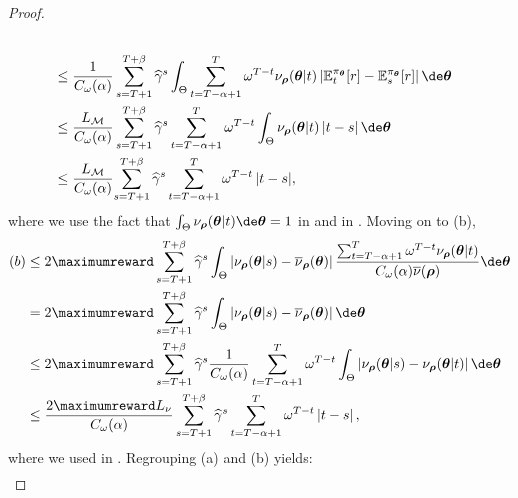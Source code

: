 \begin{proof}
\begin{align}
    \nonumber\\
    & \le \frac{1}{C_\omega(\alpha)}  \sum_{s=T+1}^{T+\beta} \widehat{\gamma}^s \int_{\Theta}  \sum_{t=T-\alpha+1}^T \omega^{T-t} {\nu}_{\boldsymbol\rho}(\boldsymbol\theta|t) \left|\mathbb{E}_t^{\pi_{\boldsymbol\theta}}[r] - \mathbb{E}_s^{\pi_{\boldsymbol\theta}}[r] \right| \de \boldsymbol\theta  
    \nonumber\\
    &  \le \frac{L_{\mathcal{M}}}{C_\omega(\alpha)}  \sum_{s=T+1}^{T+\beta} \widehat{\gamma}^s  \sum_{t=T-\alpha+1}^T \omega^{T-t} \int_{\Theta} \nu_{\boldsymbol\rho}(\boldsymbol\theta|t) \left|t-s \right|  \de \boldsymbol\theta 
    \label{eq:last_tkt1}\\
    & \le \frac{L_{\mathcal{M}}}{C_\omega(\alpha)}  {\sum_{s=T+1}^{T+\beta} \widehat{\gamma}^s   \sum_{t=T-\alpha+1}^T \omega^{T-t} \left|t-s \right|}, 
    \label{eq:last_tkt2}
\end{align}
where we use the fact that $\textstyle\int_{\Theta} {\nu}_{\boldsymbol\rho}(\boldsymbol\theta|t) \de \boldsymbol\theta = 1$ in  and  in . 
Moving on to (b),
\begin{align}
    (b) & \le 2\maximumreward  \sum_{s=T+1}^{T+\beta} \widehat{\gamma}^s \int_{\Theta}  \left|\nu_{\boldsymbol\rho}(\boldsymbol\theta|s) - \overline{\nu}_{\boldsymbol\rho}(\boldsymbol\theta)\right| \frac{\sum_{t=T-\alpha+1}^T \omega^{T-t} \nu_{\boldsymbol\rho}(\boldsymbol\theta|t) }{C_\omega(\alpha) \overline{\nu}(\boldsymbol\rho)} \de \boldsymbol\theta 
    \nonumber\\
    & = 2\maximumreward  \sum_{s=T+1}^{T+\beta} \widehat{\gamma}^s \int_{\Theta}  \left|\nu_{\boldsymbol\rho}(\boldsymbol\theta|s) - \overline{\nu}_{\boldsymbol\rho}(\boldsymbol\theta)\right|  \de \boldsymbol\theta 
    \nonumber\\
    & \le 2\maximumreward  \sum_{s=T+1}^{T+\beta} \widehat{\gamma}^s  \frac{1}{C_{\omega}(\alpha)} \sum_{t=T-\alpha+1}^{T} \omega^{T-t} \int_{\Theta} \left|\nu_{\boldsymbol\rho}(\boldsymbol\theta|s) - \nu_{\boldsymbol\rho}(\boldsymbol\theta|t) \right|  \de \boldsymbol\theta 
    \nonumber\\
    & \le  \frac{2\maximumreward  L_{\nu}}{C_{\omega}(\alpha)} \sum_{s=T+1}^{T+\beta} \widehat{\gamma}^s   \sum_{t=T-\alpha+1}^{T} \omega^{T-t} \left|t - s \right|,  
    \label{eq:last_tkt3}
\end{align}
where we used  in .
Regrouping (a) and (b) yields:
\begin{align*}

\end{align*}
\end{proof}
